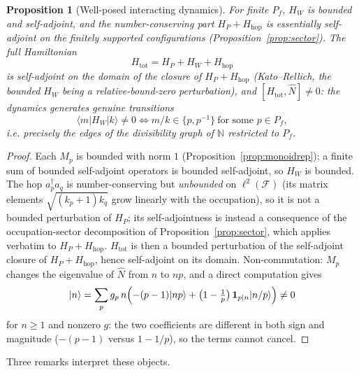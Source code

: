 \documentclass[11pt,a4paper]{article}
\theoremstyle{plain}
\newtheorem{proposition}[theorem]{Proposition}
\theoremstyle{definition}
\theoremstyle{remark}
\newcommand{\ket}[1]{\lvert #1\rangle}
\newcommand{\bra}[1]{\langle #1\rvert}
\newcommand{\Nn}{\mathbb{N}}
\newcommand{\Nhat}{\widehat{N}}
\begin{document}
\begin{proposition}[Well-posed interacting dynamics]\label{prop:wellposed}
For finite $P_{f}$, $H_{W}$ is bounded and self-adjoint, and the number-conserving part
$H_{P}+H_{\mathrm{hop}}$ is essentially self-adjoint on the finitely supported configurations
(Proposition~\ref{prop:sector}). The full Hamiltonian
\begin{equation}\label{eq:fullH}
H_{\mathrm{tot}}=H_{P}+H_{W}+H_{\mathrm{hop}}
\end{equation}
is self-adjoint on the domain of the closure of $H_{P}+H_{\mathrm{hop}}$ (Kato--Rellich, the
bounded $H_{W}$ being a relative-bound-zero perturbation), and
$[H_{\mathrm{tot}},\Nhat]\neq0$: the dynamics generates genuine transitions
\begin{equation}
\bra{m}H_{W}\ket{k}\neq 0 \iff m/k\in\{p,p^{-1}\}\ \text{for some }p\in P_{f},
\end{equation}
i.e. precisely the edges of the \emph{divisibility graph} of $\Nn$ restricted to $P_{f}$.
\end{proposition}

\begin{proof}
Each $M_{p}$ is bounded with norm $1$ (Proposition~\ref{prop:monoidrep}); a finite sum of
bounded self-adjoint operators is bounded self-adjoint, so $H_{W}$ is bounded. The hop
$a_{p}^{\dagger}a_{q}$ is number-conserving but \emph{unbounded} on $\ell^{2}(\mathcal{F})$ (its
matrix elements $\sqrt{(k_{p}+1)k_{q}}$ grow linearly with the occupation), so it is not a
bounded perturbation of $H_{P}$; its self-adjointness is instead a consequence of the
occupation-sector decomposition of Proposition~\ref{prop:sector}, which applies verbatim to
$H_{P}+H_{\mathrm{hop}}$. $H_{\mathrm{tot}}$ is then a bounded perturbation of the self-adjoint
closure of $H_{P}+H_{\mathrm{hop}}$, hence self-adjoint on its domain. Non-commutation:
$M_{p}$ changes the eigenvalue of $\Nhat$ from $n$ to $np$, and a direct computation gives
\begin{equation}
[H_{W},\Nhat]\ket{n}=\sum_{p}g_{p}\,n\Bigl(-(p-1)\ket{np}+\bigl(1-\tfrac{1}{p}\bigr)\,\mathbf{1}_{p\mid n}\ket{n/p}\Bigr)\neq0
\end{equation}
for $n\geq1$ and nonzero $g$: the two coefficients are different in both sign and magnitude
($-(p-1)$ versus $1-1/p$), so the terms cannot cancel.
\end{proof}

Three remarks interpret these objects.
\end{document}

